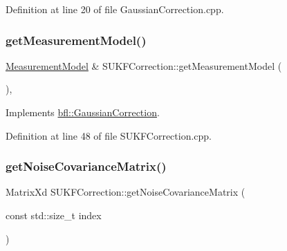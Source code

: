 Definition at line 20 of file Gaussian\+Correction.\+cpp.

\mbox{\label{classbfl_1_1SUKFCorrection_a499e3b64cc82faa71227e9ed47fc78b8}} 
\subsubsection{\texorpdfstring{get\+Measurement\+Model()}{getMeasurementModel()}}
{\footnotesize\ttfamily \mbox{\hyperlink{classbfl_1_1MeasurementModel}{Measurement\+Model}} \& S\+U\+K\+F\+Correction\+::get\+Measurement\+Model (\begin{DoxyParamCaption}{ }\end{DoxyParamCaption})\hspace{0.3cm}{\ttfamily [override]}, {\ttfamily [virtual]}}



Implements \mbox{\hyperlink{classbfl_1_1GaussianCorrection_af609a22d84cc17a7337486c339ef30c3}{bfl\+::\+Gaussian\+Correction}}.



Definition at line 48 of file S\+U\+K\+F\+Correction.\+cpp.

\mbox{\label{classbfl_1_1SUKFCorrection_a65cad252b30972be380a1078902e5c84}} 
\subsubsection{\texorpdfstring{get\+Noise\+Covariance\+Matrix()}{getNoiseCovarianceMatrix()}}
{\footnotesize\ttfamily Matrix\+Xd S\+U\+K\+F\+Correction\+::get\+Noise\+Covariance\+Matrix (\begin{DoxyParamCaption}\item[{const std\+::size\+\_\+t}]{index }\end{DoxyParamCaption})\hspace{0.3cm}{\ttfamily [protected]}}



